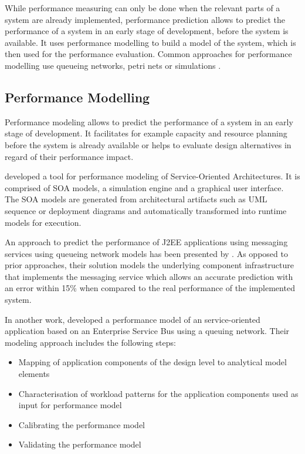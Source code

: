 While performance measuring can only be done when the relevant parts of a system are already implemented, performance prediction allows to predict the performance of a system in an early stage of development, before the system is available. It uses performance modelling to build a model of the system, which is then used for the performance evaluation. Common approaches for performance modelling use queueing networks, petri nets or simulations \citep{Balsamo:2004hn}.

\subsection{Performance Modelling}
Performance modeling allows to predict the performance of a system in an early stage of development. It facilitates for example capacity and resource planning before the system is already available or helps to evaluate design alternatives in regard of their performance impact.

\citet{Brebner:2008uq} developed a tool for performance modeling of Service-Oriented Architectures. It is comprised of SOA models, a simulation engine and a graphical user interface. The SOA models are generated from architectural artifacts such as UML sequence or deployment diagrams and automatically transformed into runtime models for execution.

An approach to predict the performance of J2EE applications using messaging services using queueing network models has been presented by \citet{Liu:2005zr}. As opposed to prior approaches, their solution models the underlying component infrastructure that implements the messaging service which allows an accurate prediction with an error within 15\% when compared to the real performance of the implemented system.

In another work, \citet{Liu:2007vn} developed a performance model of an service-oriented application based on an Enterprise Service Bus using a queuing network. Their modeling approach includes the following steps:
\begin{itemize}
	\item Mapping of application components of the design level to analytical model elements
	\item Characterisation of workload patterns for the application components used as input for performance model
	\item Calibrating the performance model
	\item Validating the performance model
\end{itemize}

